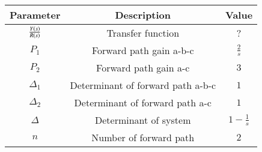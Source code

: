 \begin{tabular}{|c|c|c|}
\hline
\textbf{Parameter} & \textbf{Description} & \textbf{Value} \\ \hline
$\frac{Y\left(s\right)}{R\left(s\right)}$ & Transfer function & ?  \\ \hline
$P_1$ & Forward path gain a-b-c & $\frac{2}{s}$ \\ \hline
$P_2$ & Forward path gain a-c & $3$ \\ \hline
$\Delta_1$ & Determinant of forward path a-b-c & $1$ \\ \hline
$\Delta_2$ & Determinant of forward path a-c & $1$ \\ \hline
$\Delta$ & Determinant of system & $1-\frac{1}{s}$ \\ \hline
$n$ & Number of forward path & $2$ \\ \hline
\end{tabular}
